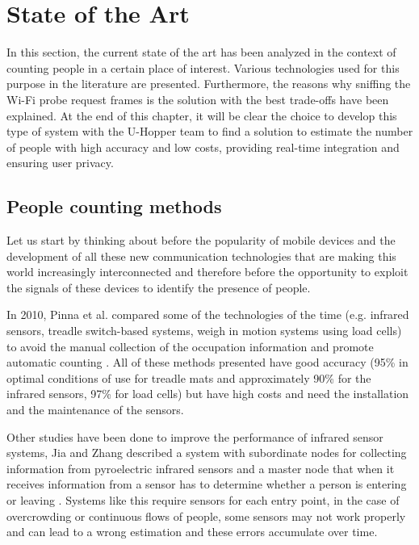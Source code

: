 \chapter{State of the Art}
\label{cha:soa}
\vspace{0.4 cm} 

In this section, the current state of the art has been analyzed in the context of counting people in a certain place of interest. Various technologies used for this purpose in the literature are presented. Furthermore, the reasons why sniffing the Wi-Fi probe request frames is the solution with the best trade-offs have been explained. At the end of this chapter, it will be clear the choice to develop this type of system with the U-Hopper team to find a solution to estimate the number of people with high accuracy and low costs, providing real-time integration and ensuring user privacy.


\section{People counting methods}
\label{sec:count}
\vspace{0.2 cm} 

Let us start by thinking about before the popularity of mobile devices and the development of all these new communication technologies that are making this world increasingly interconnected and therefore before the opportunity to exploit the signals of these devices to identify the presence of people.

In 2010, Pinna et al. compared some of the technologies of the time  (e.g. infrared sensors, treadle switch-based systems, weigh in motion systems using load cells) to avoid the manual collection of the occupation information and promote automatic counting \cite{pinna2010automatic}. All of these methods presented have good accuracy  (95\% in optimal conditions of use for treadle mats and approximately 90\% for the infrared sensors, 97\% for load cells) but have high costs and need the installation and the maintenance of the sensors.

Other studies have been done to improve the performance of infrared sensor systems, Jia and Zhang described a system with subordinate nodes for collecting information from pyroelectric infrared sensors and a master node that when it receives information from a sensor has to determine whether a person is entering or leaving \cite{jia2015application}. 
Systems like this require sensors for each entry point, in the case of overcrowding or continuous flows of people, some sensors may not work properly and can lead to a wrong estimation and these errors accumulate over time.


